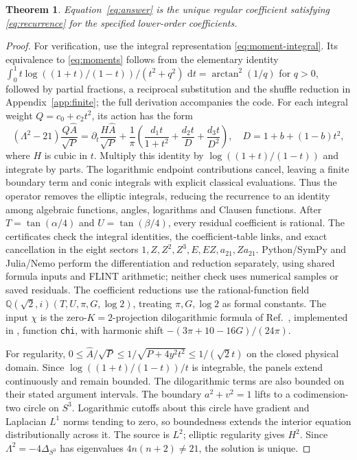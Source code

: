 \documentclass[10pt]{article}
\newcommand{\dd}{\,\mathrm d}
\newtheorem{theorem}{Theorem}
\begin{document}
\begin{theorem}
Equation~\eqref{eq:answer} is the unique regular coefficient satisfying \eqref{eq:recurrence} for the specified lower-order coefficients.
\end{theorem}
\begin{proof}
For verification, use the integral representation \eqref{eq:moment-integral}.
Its equivalence to \eqref{eq:moments} follows from the elementary identity
$\int_0^1t\log((1+t)/(1-t))/(t^2+q^2)\,\dd t=\arctan^2(1/q)$ for $q>0$, followed by partial fractions, a reciprocal substitution and the shuffle reduction in Appendix~\ref{app:finite}; the full derivation accompanies the code.
For each integral weight $Q=c_0+c_2t^2$, its action has the form
\begin{equation}
 (\Lambda^2-21)\frac{Q\widehat A}{\sqrt P}
 =\partial_t\frac{H\widehat A}{\sqrt P}
 +\frac1\pi\left(\frac{d_1t}{1+t^2}+\frac{d_2t}{D}+\frac{d_3t}{D^2}\right),
 \quad D=1+b+(1-b)t^2,
\end{equation}
where $H$ is cubic in $t$.
Multiply this identity by $\log((1+t)/(1-t))$ and integrate by parts.
The logarithmic endpoint contributions cancel, leaving a finite boundary term and conic integrals with explicit classical evaluations.
Thus the operator removes the elliptic integrals, reducing the recurrence to an identity among algebraic functions, angles, logarithms and Clausen functions.
After $T=\tan(\alpha/4)$ and $U=\tan(\beta/4)$, every residual coefficient is rational.
The certificates check the integral identities, the coefficient-table links, and exact cancellation in the eight sectors $1,Z,Z^2,Z^3,E,EZ,a_{21},Za_{21}$.
Python/SymPy and Julia/Nemo perform the differentiation and reduction separately, using shared formula inputs and FLINT arithmetic; neither check uses numerical samples or saved residuals.
The coefficient reductions use the rational-function field $\mathbb Q(\sqrt2,i)(T,U,\pi,G,\log2)$, treating $\pi,G,\log2$ as formal constants.
The input $\chi$ is the zero-$K=2$-projection dilogarithmic formula of Ref.~\cite{LB2015}, implemented in , function \texttt{chi}, with harmonic shift $-(3\pi+10-16G)/(24\pi)$.

For regularity, $0\le\widehat A/\sqrt P\le1/\sqrt{P+4y^2t^2}\le1/(\sqrt2t)$ on the closed physical domain.
Since $\log((1+t)/(1-t))/t$ is integrable, the panels extend continuously and remain bounded.
The dilogarithmic terms are also bounded on their stated argument intervals.
The boundary $a^2+v^2=1$ lifts to a codimension-two circle on $S^3$.
Logarithmic cutoffs about this circle have gradient and Laplacian $L^1$ norms tending to zero, so boundedness extends the interior equation distributionally across it.
The source is $L^2$; elliptic regularity gives $H^2$.
Since $\Lambda^2=-4\Delta_{S^3}$ has eigenvalues $4n(n+2)\ne21$, the solution is unique.
\end{proof}
\end{document}

